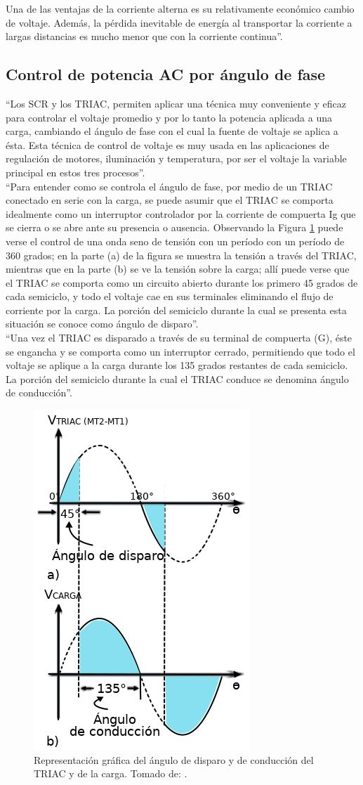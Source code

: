 Una de las ventajas de la corriente alterna es su relativamente económico cambio de voltaje. Además, la pérdida inevitable de energía al transportar la corriente a largas distancias es mucho menor que con la corriente continua''. \cite{Cor}

\subsection{Control de potencia AC por ángulo de fase}

``Los SCR y los TRIAC, permiten aplicar una técnica muy conveniente y eficaz para controlar el voltaje promedio y por lo tanto la potencia aplicada a una carga, cambiando el ángulo de fase con el cual la fuente de voltaje se aplica a ésta. Esta técnica de control de voltaje es muy usada en las aplicaciones de regulación de motores, iluminación y temperatura, por ser el voltaje la variable principal en estos tres procesos''.\cite{CEKIT}\\

``Para entender como se controla el ángulo de fase, por medio de un TRIAC conectado en serie con la carga, se puede asumir que el TRIAC se comporta idealmente como un interruptor controlador por la corriente de compuerta Ig que se cierra o se abre ante su presencia o ausencia. Observando la Figura \ref{fig:triacgraph} puede verse el control de una onda seno de tensión con un período con un período de 360 grados; en la parte (a) de la figura se muestra la tensión a través del TRIAC, mientras que en la parte (b) se ve la tensión sobre la carga; allí puede verse que el TRIAC se comporta como un circuito abierto durante los primero 45 grados de cada semiciclo, y todo el voltaje cae en sus terminales eliminando el flujo de corriente por la carga. La porción del semiciclo durante la cual se presenta esta situación se conoce como ángulo de disparo''\cite{CEKIT}.\\

``Una vez el TRIAC es disparado a través de su terminal de compuerta (G), éste se engancha y se comporta como un interruptor cerrado, permitiendo que todo el voltaje se aplique a la carga durante los 135 grados restantes de cada semiciclo. La porción del semiciclo durante la cual el TRIAC conduce se denomina ángulo de conducción''\cite{CEKIT}.

\begin{figure}[H]
	\centering
	\caption{Representación gráfica del ángulo de disparo y de conducción del TRIAC y de la carga. Tomado de: \cite{CEKIT}.}
	\label{fig:triacgraph}
	\includegraphics[width=0.3\linewidth]{Imagenes/TRIAC_graph}
\end{figure}

